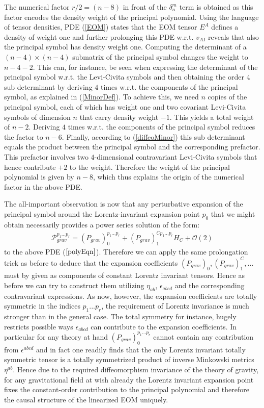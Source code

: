 The numerical factor $r/2 = (n-8)$ in front of the $\delta^m_n$ term is obtained as this factor encodes the density weight of the principal polynomial. Using the language of tensor densities, PDE (\ref{EOM}) states that the EOM tensor $E^A$ defines a density of weight one and further prolonging this PDE w.r.t. $v_{AI}$ reveals that also the principal symbol has density weight one. Computing the determinant of a $(n-4) \times (n-4)$ submatrix of the principal symbol changes the weight to $n-4-2$. This can, for instance, be seen when expressing the determinant of the principal symbol w.r.t. the Levi-Civita symbols and then obtaining the order $4$ sub determinant by deriving $4$ times w.r.t. the components of the principal symbol, as explained in (\ref{MinorDef}). To achieve this, we need $n$ copies of the principal symbol, each of which has weight one and two covariant Levi-Civita symbols of dimension $n$ that carry density weight $-1$. This yields a total weight of $n-2$. Deriving $4$ times w.r.t. the components of the principal symbol reduces the factor to $n-6$. Finally, according to (\ref{diffeoMinor}) this sub determinant equals the product between the principal symbol and the corresponding prefactor. This prefactor involves two $4$-dimensional contravariant Levi-Civita symbols that hence contribute $+2$ to the weight. Therefore the weight of the principal polynomial is given by $n-8$, which thus explains the origin of the numerical factor in the above PDE. 

The all-important observation is now that any perturbative expansion of the principal symbol around the Lorentz-invariant expansion point $p_0$ that we might obtain necessarily provides a power series solution of the form:
\begin{align}
    \mathcal{P}_{grav}^{{p_1}...{p_{r}}} = (P_{grav})^{{p_1}...{p_{r}}}_0 + (P_{grav})_1^{C{p_1}...{p_{r}}} H_C + \mathcal{O}(2)
\end{align}
to the above PDE ($\ref{polyEqn}$). Therefore we can apply the same prolongation trick as before to deduce that the expansion coefficients $(P_{grav})_0, (P_{grav})_1^C,...$ must by given as components of constant Lorentz invariant tensors. Hence as before we can try to construct them utilizing $\eta_{ab}$, $\epsilon_{abcd}$ and the corresponding contravariant expressions. As now, however, the expansion coefficients are totally symmetric in the indices $p_1...p_r$, the requirement of Lorentz invariance is much stronger than in the general case. The total symmetry for instance, hugely restricts possible ways $\epsilon_{abcd}$ can contribute to the expansion coefficients. In particular for any theory at hand $(P_{grav})_0^{{p_1}...{p_{r}}}$ cannot contain any contribution from $\epsilon^{abcd}$ and in fact one readily finds that the only Lorentz invariant totally symmetric tensor is a totally symmetrized product of inverse Minkowski metrics $\eta^{ab}$. Hence due to the required diffeomorphism invariance of the theory of gravity, for any gravitational field at wish already the Lorentz invariant expansion point fixes the constant-order contribution to the principal polynomial and therefore the causal structure of the linearized EOM uniquely.

